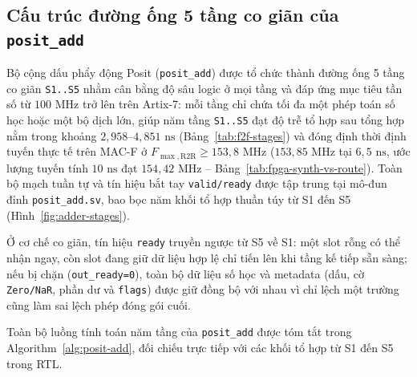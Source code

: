 \subsection{Cấu trúc đường ống 5 tầng co giãn của \texttt{posit\_add}}

Bộ cộng dấu phẩy động Posit (\texttt{posit\_add}) được tổ chức thành đường ống
5 tầng co giãn \texttt{S1..S5} nhằm cân bằng độ sâu logic ở mọi tầng và đáp ứng
mục tiêu tần số từ $100\text{ MHz}$ trở lên trên Artix-7: mỗi tầng chỉ chứa tối
đa một phép toán số học hoặc một bộ dịch lớn, giúp năm tầng \texttt{S1..S5}
đạt độ trễ tổ hợp sau tổng hợp nằm trong khoảng $2{,}958\text{--}4{,}851\text{ ns}$
(Bảng~\ref{tab:f2f-stages}) và đóng định thời định tuyến thực tế trên MAC-F ở
$F_{\max,\mathrm{R2R}} \ge 153{,}8\text{ MHz}$ ($153{,}85\text{ MHz}$ tại $6{,}5\text{ ns}$,
ước lượng tuyến tính $10\text{ ns}$ đạt $154{,}42\text{ MHz}$ -- Bảng~\ref{tab:fpga-synth-vs-route}).
Toàn bộ mạch tuần tự và tín hiệu bắt tay \texttt{valid/ready} được tập trung tại
mô-đun đỉnh \texttt{posit\_add.sv}, bao bọc năm khối tổ hợp thuần túy từ S1 đến S5
(Hình~\ref{fig:adder-stages}).

Ở cơ chế co giãn, tín hiệu \texttt{ready} truyền ngược từ S5 về S1: một slot rỗng
có thể nhận ngay, còn slot đang giữ dữ liệu hợp lệ chỉ tiến lên khi tầng kế tiếp
sẵn sàng; nếu bị chặn (\texttt{out\_ready=0}), toàn bộ dữ liệu số học và
metadata (dấu, cờ \texttt{Zero/NaR}, phần dư và \texttt{flags}) được giữ đồng bộ
với nhau vì chỉ lệch một trường cũng làm sai lệch phép đóng gói cuối.



Toàn bộ luồng tính toán năm tầng của \texttt{posit\_add} được tóm tắt
trong Algorithm~\ref{alg:posit-add}, đối chiếu trực tiếp với các khối tổ
hợp từ S1 đến S5 trong RTL.

